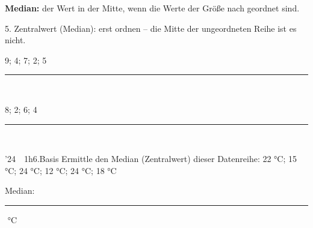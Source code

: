 \documentclass[11pt]{article}
\newcommand{\gbegriff}[1]{\par\nobreak\noindent\hspace*{\mbpfnr}\parbox[t]{\dimexpr\linewidth-\mbpfnr\relax}{\raggedright\small\color{mbgrau}#1}\par\nobreak\addvspace{3pt}}
\newcommand{\linie}[1]{\,{\color{black!45}\rule[-1pt]{#1}{0.4pt}}\,}
\newcommand{\pkt}{\textperiodcentered{}}
\begin{document}
\Needspace*{0.16\textheight}\gbegriff{\textbf{Median:} der Wert in der Mitte, wenn die Werte der Größe nach geordnet sind.}
\begin{pfaufg}{}{5.}{}
Zentralwert (Median): erst ordnen – die Mitte der ungeordneten Reihe ist es nicht.
\par\smallskip
\par\noindent{}9; 4; 7; 2; 5\hfill\linie{30mm}
\par\noindent{}8; 2; 6; 4\hfill\linie{30mm}
\par{}
\end{pfaufg}
\begin{pfaufg}{’24~\pkt{}~1h}{6.}{Basis}
Ermittle den Median (Zentralwert) dieser Datenreihe: 22 °C; 15 °C; 24 °C; 12 °C; 24 °C; 18 °C
\par\smallskip\par\noindent \hfill Median: \linie{30mm}\,°C
\end{pfaufg}
\end{document}

